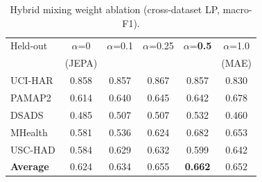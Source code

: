 \begin{table}[t]
\centering
\caption{Hybrid mixing weight ablation (cross-dataset LP, macro-F1).}
\label{tab:alpha}
\begin{tabular}{lccccc}
\toprule
Held-out & $\alpha$=0 & $\alpha$=0.1 & $\alpha$=0.25 & $\alpha$=\textbf{0.5} & $\alpha$=1.0 \\
 & (JEPA) & & & & (MAE) \\
\midrule
UCI-HAR & 0.858 & 0.857 & 0.867 & 0.857 & 0.830 \\
PAMAP2 & 0.614 & 0.640 & 0.645 & 0.642 & 0.678 \\
DSADS & 0.485 & 0.507 & 0.507 & 0.532 & 0.460 \\
MHealth & 0.581 & 0.536 & 0.624 & 0.682 & 0.653 \\
USC-HAD & 0.584 & 0.629 & 0.632 & 0.599 & 0.642 \\
\midrule
\textbf{Average} & 0.624 & 0.634 & 0.655 & \textbf{0.662} & 0.652 \\
\bottomrule
\end{tabular}
\end{table}